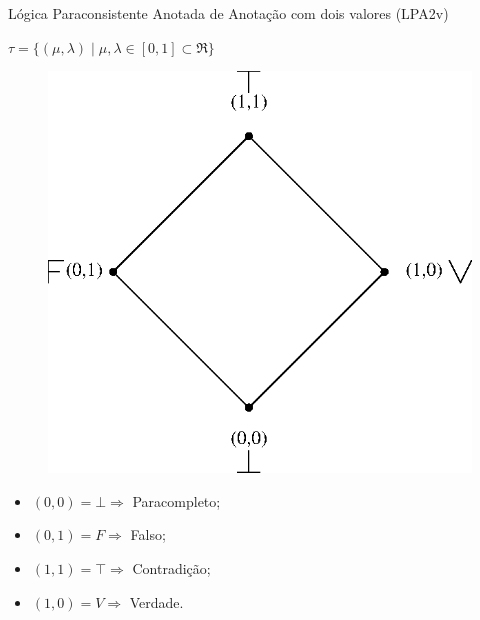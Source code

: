 \begin{frame}{Lógica Paraconsistente Anotada de Anotação com dois valores (LPA2v) \tiny \cite{JoaoInacio}}

\begin{block}{
\centering 
$\tau = \{ ( \mu , \lambda ) \mid \mu ,\lambda \in [0,1] \subset \Re \}$
}
\end{block}
\vspace{0.4cm}
\begin{minipage}{0.40\linewidth}
\begin{figure}[!htb]
\center\includegraphics[scale=0.6]{./imagens/C421reticuladoHasse.eps}
\label{fig:reticuladoHasse}
\end{figure}
\end{minipage}
\begin{minipage}{0.55\linewidth}
\center
\begin{itemize}
\item $(0,0) = \bot \Rightarrow $ Paracompleto;
\item $(0,1) = F \Rightarrow $ Falso;
\item $(1,1) = \top \Rightarrow $ Contradição;
\item $(1,0) = V \Rightarrow $ Verdade.
\end{itemize}
\end{minipage}

\end{frame}
